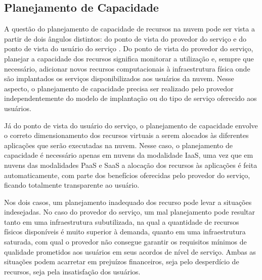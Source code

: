 

\subsection{Planejamento de Capacidade}

A questão do planejamento de capacidade de recursos na nuvem pode ser vista a partir de dois ângulos distintos: do ponto de vista do provedor do serviço e do ponto de vista do usuário do serviço \cite{Menasce2009}. Do ponto de vista do provedor do serviço, planejar a capacidade dos recursos significa monitorar a utilização e, sempre que necessário, adicionar novos  recursos computacionais à infraestrutura física onde são implantados os serviços disponibilizados aos usuários da nuvem. Nesse aspecto, o planejamento de capacidade precisa ser realizado pelo provedor independentemente do modelo de implantação ou do tipo de serviço oferecido aos usuários.

Já do ponto de vista do usuário do serviço, o planejamento de capacidade envolve o correto dimensionamento dos recursos virtuais a serem alocados às diferentes aplicações que serão executadas na nuvem. Nesse caso, o planejamento de capacidade é necessário apenas em nuvens da modalidade IaaS, uma vez que em nuvens das modalidades PaaS e SaaS a alocação dos recursos às aplicações é feita automaticamente, com parte dos benefícios oferecidas pelo provedor do serviço, ficando totalmente transparente ao usuário. 

Nos dois casos, um planejamento inadequado dos recurso pode levar a situações indesejadas. No caso do provedor do serviço, um mal planejamento pode resultar tanto em uma infraestrutura subutilizada, na qual a quantidade de recursos físicos disponíveis é muito superior à demanda, quanto em uma infraestrutura saturada, com qual o provedor não consegue garantir os requisitos mínimos de qualidade prometidos aos usuários em seus acordos de nível de serviço. Ambas as situações podem acarretar em prejuízos financeiros, seja pelo desperdício de recursos, seja pela insatisfação dos usuários.


